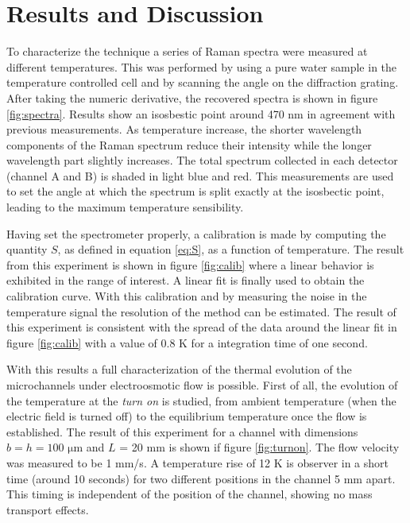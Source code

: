 \documentclass[twocolumn]{svjour3}       %
\begin{document}
\section{Results and Discussion}

To characterize the technique a series of Raman spectra were measured at different temperatures. This was performed by using a pure water sample in the temperature controlled cell and by scanning the angle on the diffraction grating. After taking the numeric derivative, the recovered spectra is shown in figure \ref{fig:spectra}. Results show an isosbestic point around 470 nm in agreement with previous measurements\cite{walrafen1}. As temperature increase, the shorter wavelength components of the Raman spectrum reduce their intensity while the longer wavelength part slightly increases. The total spectrum collected in each detector (channel A and B) is shaded in light blue and red. This measurements are used to set the angle at which the spectrum is split exactly at the isosbectic point, leading to the maximum temperature sensibility. 

Having set the spectrometer properly, a calibration is made by computing the quantity $S$, as defined in equation \ref{eq:S}, as a function of temperature. The result from this experiment is shown in figure \ref{fig:calib} where a linear behavior is exhibited in the range of interest. A linear fit is finally used to obtain the calibration curve. With this calibration and by measuring the noise in the temperature signal  the resolution of the method can be estimated. The result of this experiment is consistent with the spread of the data around the linear fit in figure \ref{fig:calib} with a value of 0.8 K for a integration time of one second.

With this results a full characterization of the thermal evolution of the microchannels under electroosmotic flow is possible. First of all, the evolution of the temperature at the \textit{turn on} is studied, from ambient temperature (when the electric field is turned off) to the equilibrium temperature once the flow is established. The result of this experiment for a channel with dimensions $b = h = 100$ $\mathrm{\mu m}$ and $L$ = 20 mm is shown if figure \ref{fig:turnon}. The flow velocity was measured to be 1 mm/s. A temperature rise of 12 K is observer in a short time (around 10 seconds) for two different positions in the channel 5 mm apart. This timing is independent of the position of the channel, showing no mass transport effects.
\end{document}
